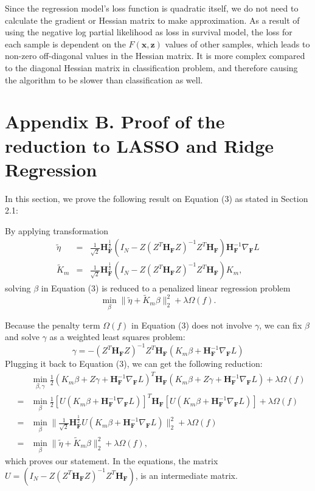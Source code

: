 \documentclass[a4paper,12pt]{article}
\newcommand{\bd}[1]{\mathbf{#1}}
\newcommand{\grad}[2]{\nabla_{\bd{#2}} #1}
\newcommand{\hess}[1]{\bd{H}_{\bd{#1}}}
\begin{document}
	
	Since the regression model's loss function is quadratic itself, we do not need to calculate the gradient or Hessian matrix to make approximation. As a result of using the negative log partial likelihood as loss in survival model, the loss for each sample is dependent on the $F(\bd{x}, \bd{z})$ values of other samples, which leads to non-zero off-diagonal values in the Hessian matrix. It is more complex compared to the diagonal Hessian matrix in classification problem, and therefore causing the algorithm to be slower than classification as well.
	\newpage
	\section*{Appendix B. Proof of the reduction to LASSO and Ridge Regression} \label{sec:proof}
	In this section, we prove the following result on Equation (3) as stated in Section 2.1:
	
	By applying transformation
	\begin{eqnarray*}
		\tilde{\eta} &=& \frac{1}{\sqrt{2}}\hess{F}^{\frac{1}{2}}(I_N - Z(Z^T \hess{F} Z)^{-1}Z^T \hess{F})\hess{F}^{-1}\grad{L}{F}\\
		\tilde{K}_m &=& \frac{1}{\sqrt{2}}\hess{F}^{\frac{1}{2}}(I_N - Z(Z^T\hess{F}Z)^{-1}Z^T\hess{F})K_m,
	\end{eqnarray*}
	solving $\beta$ in Equation (3) is reduced to a penalized linear regression problem
	\begin{equation*}
	\min_{\beta} \|\tilde{\eta} + \tilde{K}_m \beta \|_2^2 + \lambda \Omega(f).
	\end{equation*}
	
	Because the penalty term $\Omega(f)$ in Equation (3) does not involve $\gamma$, we can fix $\beta$ and solve $\gamma$ as a weighted least squares problem:
	$$\gamma = -(Z^T\hess{F}Z)^{-1}Z^T\hess{F}(K_m\beta + \hess{F}^{-1}\grad{L}{F})$$
	Plugging it back to Equation (3), we can get the following reduction:
	\begin{eqnarray*}
		& & \min_{\beta, \gamma} \frac{1}{2} (K_m \beta + Z \gamma + \hess{F}^{-1} \grad{L}{F})^T \hess{F} (K_m \beta + Z \gamma + \hess{F}^{-1} \grad{L}{F}) + \lambda \Omega(f) \\
		& = & \min_{\beta} \frac{1}{2} [ U(K_m \beta + \hess{F}^{-1} \grad{L}{F}) ]^T \hess{F} [ U (K_m \beta + \hess{F}^{-1} \grad{L}{F}) ]  + \lambda \Omega(f) \\
		& = & \min_{\beta}  \| \frac{1}{\sqrt{2}}\hess{F}^{\frac{1}{2}}U(K_m \beta + \hess{F}^{-1} \grad{L}{F}) \|_2^2+ \lambda \Omega(f) \\
		&=& \min_{\beta} \|\tilde{\eta} + \tilde{K}_m \beta \|_2^2 + \lambda \Omega(f), 
	\end{eqnarray*}
	which proves our statement. In the equations, the matrix $U = (I_N -Z(Z^T\hess{F}Z)^{-1}Z^T\hess{F})$, is an intermediate matrix.
	
\end{document}
